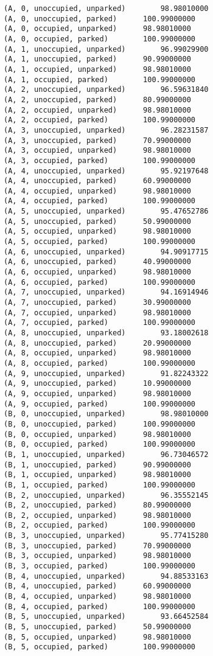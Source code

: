 \documentclass[paper=a4, fontsize=11pt]{scrartcl}
\begin{document}
\begin{verbatim}
(A, 0, unoccupied, unparked)		98.98010000
(A, 0, unoccupied, parked)		100.99000000
(A, 0, occupied, unparked)		98.98010000
(A, 0, occupied, parked)		100.99000000
(A, 1, unoccupied, unparked)		96.99029900
(A, 1, unoccupied, parked)		90.99000000
(A, 1, occupied, unparked)		98.98010000
(A, 1, occupied, parked)		100.99000000
(A, 2, unoccupied, unparked)		96.59631840
(A, 2, unoccupied, parked)		80.99000000
(A, 2, occupied, unparked)		98.98010000
(A, 2, occupied, parked)		100.99000000
(A, 3, unoccupied, unparked)		96.28231587
(A, 3, unoccupied, parked)		70.99000000
(A, 3, occupied, unparked)		98.98010000
(A, 3, occupied, parked)		100.99000000
(A, 4, unoccupied, unparked)		95.92197648
(A, 4, unoccupied, parked)		60.99000000
(A, 4, occupied, unparked)		98.98010000
(A, 4, occupied, parked)		100.99000000
(A, 5, unoccupied, unparked)		95.47652786
(A, 5, unoccupied, parked)		50.99000000
(A, 5, occupied, unparked)		98.98010000
(A, 5, occupied, parked)		100.99000000
(A, 6, unoccupied, unparked)		94.90917715
(A, 6, unoccupied, parked)		40.99000000
(A, 6, occupied, unparked)		98.98010000
(A, 6, occupied, parked)		100.99000000
(A, 7, unoccupied, unparked)		94.16914946
(A, 7, unoccupied, parked)		30.99000000
(A, 7, occupied, unparked)		98.98010000
(A, 7, occupied, parked)		100.99000000
(A, 8, unoccupied, unparked)		93.18002618
(A, 8, unoccupied, parked)		20.99000000
(A, 8, occupied, unparked)		98.98010000
(A, 8, occupied, parked)		100.99000000
(A, 9, unoccupied, unparked)		91.82243322
(A, 9, unoccupied, parked)		10.99000000
(A, 9, occupied, unparked)		98.98010000
(A, 9, occupied, parked)		100.99000000
(B, 0, unoccupied, unparked)		98.98010000
(B, 0, unoccupied, parked)		100.99000000
(B, 0, occupied, unparked)		98.98010000
(B, 0, occupied, parked)		100.99000000
(B, 1, unoccupied, unparked)		96.73046572
(B, 1, unoccupied, parked)		90.99000000
(B, 1, occupied, unparked)		98.98010000
(B, 1, occupied, parked)		100.99000000
(B, 2, unoccupied, unparked)		96.35552145
(B, 2, unoccupied, parked)		80.99000000
(B, 2, occupied, unparked)		98.98010000
(B, 2, occupied, parked)		100.99000000
(B, 3, unoccupied, unparked)		95.77415280
(B, 3, unoccupied, parked)		70.99000000
(B, 3, occupied, unparked)		98.98010000
(B, 3, occupied, parked)		100.99000000
(B, 4, unoccupied, unparked)		94.88533163
(B, 4, unoccupied, parked)		60.99000000
(B, 4, occupied, unparked)		98.98010000
(B, 4, occupied, parked)		100.99000000
(B, 5, unoccupied, unparked)		93.66452584
(B, 5, unoccupied, parked)		50.99000000
(B, 5, occupied, unparked)		98.98010000
(B, 5, occupied, parked)		100.99000000

\end{verbatim}
\end{document}
